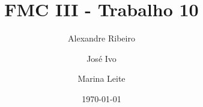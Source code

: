 \documentclass[12pt]{article}
\begin{document}
\title{FMC III - Trabalho 10}
\author{Alexandre Ribeiro \and José Ivo \and Marina Leite}
\date{\today}

\maketitle






\end{document}
